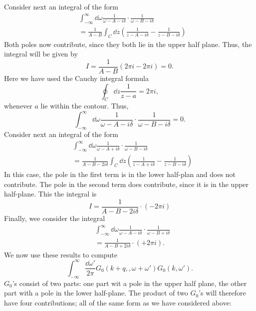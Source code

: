 Consider next an integral of the form 
\begin{align*}
	&\int_{-\infty}^\infty\dd{\omega}\frac{1}{\omega-A-i\delta}\cdot\frac{1}{\omega-B-i\delta} \\
	&=\frac{1}{A-B}\int_C\dd{z}\left(\frac{1}{z-A-i\delta}-\frac{1}{z-B-i\delta}\right)
\end{align*}
Both poles now contribute, since they both lie in the upper half plane. Thus, the integral will be given by 
\begin{equation}
I  =\frac{1}{A-B}\left (2\pi i-2\pi i\right ) = 0.
\end{equation}
Here we have used the Cauchy integral formula 
\begin{equation}
\oint_C\dd{z}\frac{1}{z-a} = 2\pi i, 
\end{equation}
whenever $a$ lie within the contour.
Thus, 
\begin{equation}\label{key}
\int_{-\infty}^\infty\dd{\omega}\frac{1}{\omega-A-i\delta}\cdot\frac{1}{\omega-B-i\delta} = 0.
\end{equation}
Consider next an integral of the form 
\begin{align*}
	&\int_{-\infty}^\infty\dd{\omega}\frac{1}{\omega-A+i\delta}\cdot\frac{1}{\omega-B-i\delta}\\
	&= \frac{1}{A-B-2i\delta}\int_C\dd{z}\left(\frac{1}{z-A+i\delta} - \frac{1}{z-B-i\delta}\right)
\end{align*}
In this case, the pole in the first term is in the lower half-plan and does not contribute. The pole in the second term does contribute, since it is in the upper half-plane. This the integral is 
\begin{equation}\label{key}
I = \frac{1}{A-B-2i\delta}\cdot(-2\pi i)
\end{equation}
Finally, wee consider the integral 
\begin{align*}
		&\int_{-\infty}^\infty\dd{\omega}\frac{1}{\omega-A-i\delta}\cdot\frac{1}{\omega-B+i\delta}\\&=\frac{1}{A-B+2i\delta}\cdot(+2\pi i).
\end{align*}
We now use these results to compute
\begin{equation}
	\int_{-\infty}^\infty\frac{\dd{\omega'}}{2\pi}G_0(k+q, ,\omega+\omega')G_0(k,\omega').
\end{equation}
$G_0$'s consist of two parts: one part wit a pole in the upper half plane, the other part with a pole in the lower half-plane.
The product of two $G_0$'s will therefore have four contributions; all of the same form as we have considered above:
